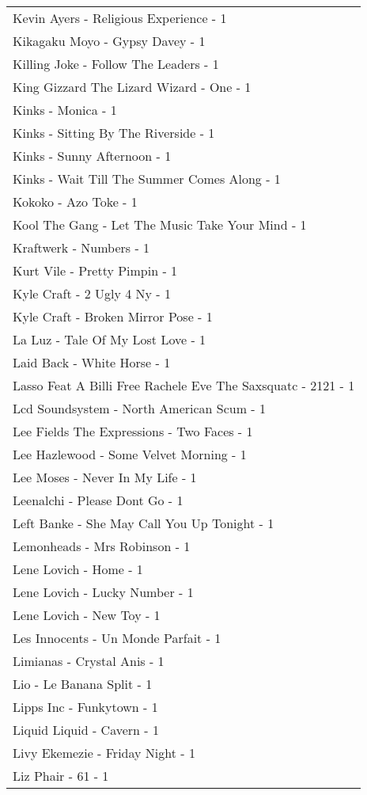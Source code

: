 \documentclass[
]{article}
\begin{document}
\begin{longtable}{l}
Kevin Ayers - Religious Experience - 1 \\ 
Kikagaku Moyo - Gypsy Davey - 1 \\ 
Killing Joke - Follow The Leaders - 1 \\ 
King Gizzard The Lizard Wizard - One - 1 \\ 
Kinks - Monica - 1 \\ 
Kinks - Sitting By The Riverside - 1 \\ 
Kinks - Sunny Afternoon - 1 \\ 
Kinks - Wait Till The Summer Comes Along - 1 \\ 
Kokoko - Azo Toke - 1 \\ 
Kool The Gang - Let The Music Take Your Mind - 1 \\ 
Kraftwerk - Numbers - 1 \\ 
Kurt Vile - Pretty Pimpin - 1 \\ 
Kyle Craft - 2 Ugly 4 Ny - 1 \\ 
Kyle Craft - Broken Mirror Pose - 1 \\ 
La Luz - Tale Of My Lost Love - 1 \\ 
Laid Back - White Horse - 1 \\ 
Lasso Feat A Billi Free Rachele Eve The Saxsquatc - 2121 - 1 \\ 
Lcd Soundsystem - North American Scum - 1 \\ 
Lee Fields The Expressions - Two Faces - 1 \\ 
Lee Hazlewood - Some Velvet Morning - 1 \\ 
Lee Moses - Never In My Life - 1 \\ 
Leenalchi - Please Dont Go - 1 \\ 
Left Banke - She May Call You Up Tonight - 1 \\ 
Lemonheads - Mrs Robinson - 1 \\ 
Lene Lovich - Home - 1 \\ 
Lene Lovich - Lucky Number - 1 \\ 
Lene Lovich - New Toy - 1 \\ 
Les Innocents - Un Monde Parfait - 1 \\ 
Limianas - Crystal Anis - 1 \\ 
Lio - Le Banana Split - 1 \\ 
Lipps Inc - Funkytown - 1 \\ 
Liquid Liquid - Cavern - 1 \\ 
Livy Ekemezie - Friday Night - 1 \\ 
Liz Phair - 61 - 1 \\ 

\end{longtable}
\end{document}
